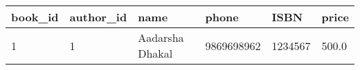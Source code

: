 \begin{longtable}[]{@{}llllll@{}}
\toprule
book\_id & author\_id & name & phone &
ISBN & price \\
\midrule
\endhead
1 & 1 & Aadarsha Dhakal
& 9869698962 & 1234567 & 500.0 \\
\bottomrule
\end{longtable}
